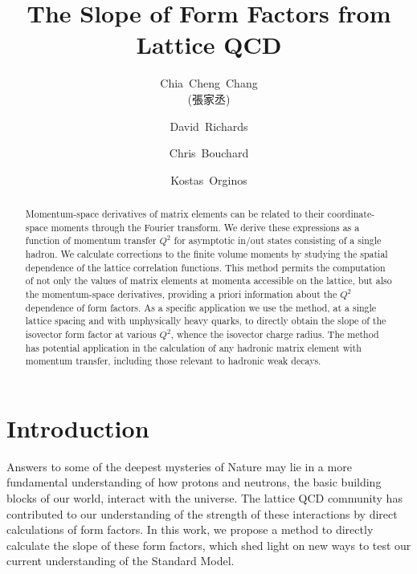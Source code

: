 \documentclass[prd,aps,twocolumn,superscriptaddress,tightenlines,nofootinbib,floatfix,preprintnumbers,10pt]{revtex4-1}
\newcommand{\mydate}{\ \today \ - \number\hour :\number\minute}
\begin{document}
\title{The Slope of Form Factors from Lattice QCD}

\author{Chia~Cheng~Chang \begin{CJK*}{UTF8}{bsmi}(張家丞)\end{CJK*}}
\affiliation{\ithems}
\affiliation{\lblnsd}
\affiliation{\ucb}


\author{David~Richards}
\affiliation{\jlab}

\author{Chris~Bouchard}
\affiliation{\glasgow}

\author{Kostas~Orginos}
\affiliation{\wm}
\affiliation{\jlab}




\begin{abstract}
Momentum-space derivatives of matrix elements can be related to their coordinate-space moments through the Fourier transform. We derive these expressions as a function of momentum transfer $Q^2$ for asymptotic in/out states consisting of a single hadron. We calculate corrections to the finite volume moments by studying the spatial dependence of the lattice correlation functions. This method permits the computation of not only the values of matrix elements at momenta accessible on the lattice, but also the momentum-space derivatives, providing a priori information about the $Q^2$ dependence of form factors. As a specific application we use the method, at a single lattice spacing and with unphysically heavy quarks, to directly obtain the slope of the isovector form factor at various $Q^2$, whence the isovector charge radius. The method has potential application in the calculation of any hadronic matrix element with momentum transfer, including those relevant to hadronic weak decays.
\end{abstract}
\maketitle



\section{Introduction\label{sec:intro}}
Answers to some of the deepest mysteries of Nature may lie in a more 
fundamental understanding of how protons and neutrons, the
basic building blocks of our world, interact with the universe. The
lattice QCD community has contributed to our understanding of the
strength of these interactions by direct calculations of form
factors. In this work, we propose a method to directly calculate the
slope of these form factors, which shed light on new ways to test our
current understanding of the Standard Model.
\end{document}
